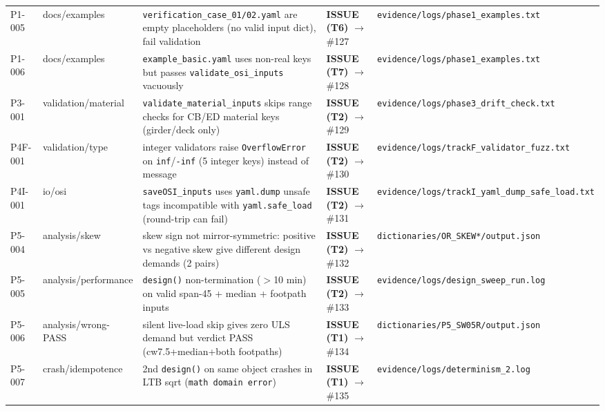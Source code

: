 \begin{longtable}{@{}p{1.4cm}p{3.0cm}p{6.2cm}p{2.6cm}p{2.0cm}@{}}
P1-005 & docs/examples & \texttt{verification\_case\_01/02.yaml} are empty placeholders (no valid input dict), fail validation & \textbf{ISSUE (T6)} $\rightarrow$ \#127 & \texttt{evidence/logs/phase1\_examples.txt} \\
P1-006 & docs/examples & \texttt{example\_basic.yaml} uses non-real keys but passes \texttt{validate\_osi\_inputs} vacuously & \textbf{ISSUE (T7)} $\rightarrow$ \#128 & \texttt{evidence/logs/phase1\_examples.txt} \\
P3-001 & validation/material & \texttt{validate\_material\_inputs} skips range checks for CB/ED material keys (girder/deck only) & \textbf{ISSUE (T2)} $\rightarrow$ \#129 & \texttt{evidence/logs/phase3\_drift\_check.txt} \\
P4F-001 & validation/type & integer validators raise \texttt{OverflowError} on \texttt{inf}/\texttt{-inf} (5 integer keys) instead of message & \textbf{ISSUE (T2)} $\rightarrow$ \#130 & \texttt{evidence/logs/trackF\_validator\_fuzz.txt} \\
P4I-001 & io/osi & \texttt{saveOSI\_inputs} uses \texttt{yaml.dump} unsafe tags incompatible with \texttt{yaml.safe\_load} (round-trip can fail) & \textbf{ISSUE (T2)} $\rightarrow$ \#131 & \texttt{evidence/logs/trackI\_yaml\_dump\_safe\_load.txt} \\
P5-004 & analysis/skew & skew sign not mirror-symmetric: positive vs negative skew give different design demands (2 pairs) & \textbf{ISSUE (T2)} $\rightarrow$ \#132 & \texttt{dictionaries/OR\_SKEW*/output.json} \\
P5-005 & analysis/performance & \texttt{design()} non-termination ($>$10 min) on valid span-45 + median + footpath inputs & \textbf{ISSUE (T2)} $\rightarrow$ \#133 & \texttt{evidence/logs/design\_sweep\_run.log} \\
P5-006 & analysis/wrong-PASS & silent live-load skip gives zero ULS demand but verdict PASS (cw7.5+median+both footpaths) & \textbf{ISSUE (T1)} $\rightarrow$ \#134 & \texttt{dictionaries/P5\_SW05R/output.json} \\
P5-007 & crash/idempotence & 2nd \texttt{design()} on same object crashes in LTB sqrt (\texttt{math domain error}) & \textbf{ISSUE (T1)} $\rightarrow$ \#135 & \texttt{evidence/logs/determinism\_2.log} \\
\bottomrule
\end{longtable}
